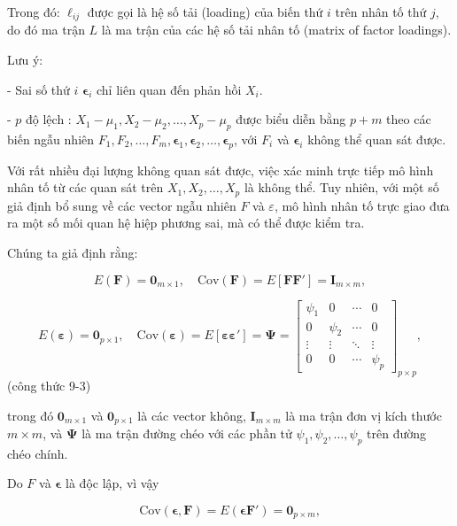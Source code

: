 \documentclass{article}
\begin{document}
Trong đó: \(\ell_{ij}\) được gọi là hệ số tải (loading) của biến thứ \(i\) trên nhân tố thứ \(j\), do đó ma trận \(L\) là ma trận của các hệ số tải nhân tố (matrix of factor loadings).

Lưu ý: 

- Sai số thứ \(i\) \(\boldsymbol{\epsilon}_i\) chỉ liên quan đến phản hồi \(X_i\).

- \(p\) độ lệch : \(X_1 - \mu_1, X_2 - \mu_2, \ldots, X_p - \mu_p\) được biểu diễn bằng \(p + m\) theo các biến ngẫu nhiên  \(F_1, F_2, \ldots, F_m, \boldsymbol{\epsilon}_1, \boldsymbol{\epsilon}_2, \ldots, \boldsymbol{\epsilon}_p\), với \(F_i\) và \(\boldsymbol{\epsilon}_i\) không thể quan sát được.

Với rất nhiều đại lượng không quan sát được, việc xác minh trực tiếp mô hình nhân tố từ các quan sát trên \(X_1, X_2, \ldots, X_p\) là không thể. Tuy nhiên, với một số giả định bổ sung về các vector ngẫu nhiên \(F\) và \(\varepsilon\), mô hình nhân tố trực giao đưa ra một số mối quan hệ hiệp phương sai, mà có thể được kiểm tra.


Chúng ta giả định rằng:

\[
E(\mathbf{F}) = \mathbf{0}_{m \times 1}, \quad \text{Cov}(\mathbf{F}) = E[\mathbf{FF}'] = \mathbf{I}_{m \times m},
\]

\[
E(\boldsymbol{\varepsilon}) = \mathbf{0}_{p \times 1}, \quad \text{Cov}(\boldsymbol{\varepsilon}) = E[\boldsymbol{\varepsilon} \boldsymbol{\varepsilon}'] = \boldsymbol{\Psi} =
\begin{bmatrix}
\psi_1 & 0 & \cdots & 0 \\
0 & \psi_2 & \cdots & 0 \\
\vdots & \vdots & \ddots & \vdots \\
0 & 0 & \cdots & \psi_p
\end{bmatrix}_{p \times p},
\]
(công thức 9-3)

trong đó \(\mathbf{0}_{m \times 1}\) và \(\mathbf{0}_{p \times 1}\) là các vector không, \(\mathbf{I}_{m \times m}\) là ma trận đơn vị kích thước \(m \times m\), và \(\boldsymbol{\Psi}\) là ma trận đường chéo với các phần tử \(\psi_1, \psi_2, \ldots, \psi_p\) trên đường chéo chính.

Do \(F\) và \(\boldsymbol{\epsilon}\) là độc lập, vì vậy

\[
\text{Cov}(\boldsymbol{\epsilon}, \mathbf{F}) = E(\boldsymbol{\epsilon}\mathbf{F}') = \mathbf{0}_{p \times m},
\]
\end{document}
